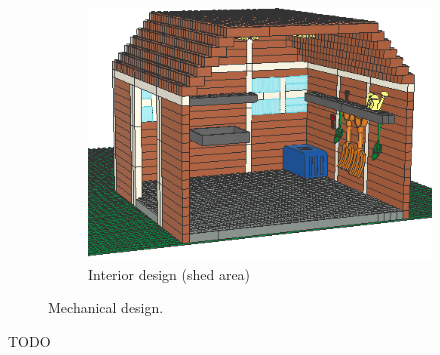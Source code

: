 \documentclass{PDS}
\begin{document}
\begin{figure}[htbp]
\begin{subfigure}[b]{0.3\textwidth}
        \includegraphics[width=\textwidth]{./figures/glasshouse_3.png}
        \caption{Interior design (shed area)}
        \label{fig:glasshouse_3}
    \end{subfigure}
    \caption{Mechanical design.}
    \label{fig:glasshouse}
\end{figure}

TODO
\end{document}
